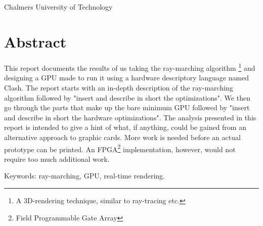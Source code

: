 \varHeadline\\
\varSubtitle\\
\varNames\\
\varDepartment\\
Chalmers University of Technology \setlength{\parskip}{0.5cm}

\thispagestyle{plain}			%
\setlength{\parskip}{0pt plus 1.0pt}
\section*{Abstract}

This report documents the results of us taking the ray-marching algorithm
\footnote{A 3D-rendering technique, similar to ray-tracing etc.} and designing
a GPU made to run it using a hardware descriptory language named
Clash.\cite{Raa2015} The report starts with an in-depth description of the
ray-marching algorithm followed by "insert and describe in short the
optimizations". We then go through the parts that make up the bare minimum GPU
followed by "insert and describe in short the hardware optimizations". The
analysis presented in this report is intended to give a hint of what, if
anything, could be gained from an alternative approach to graphic cards. More
work is needed before an actual prototype can be printed. An
FPGA\footnote{Field Programmable Gate Array} implementation, however, would not
require too much additional work.


\vfill
Keywords: ray-marching, GPU, real-time rendering.

\newpage				%
\thispagestyle{empty}
\mbox{}
